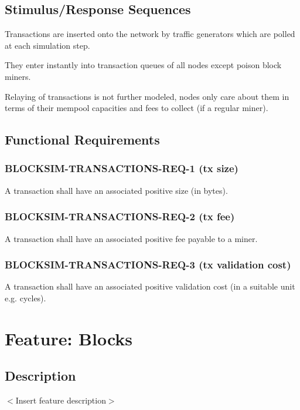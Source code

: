 \documentclass{scrreprt}
\begin{document}
\subsection{Stimulus/Response Sequences}

Transactions are inserted onto the network by traffic generators which are
polled at each simulation step.

They enter instantly into transaction queues of all nodes except poison block
miners.

Relaying of transactions is not further modeled, nodes only care about
them in terms of their mempool capacities and fees to collect
(if a regular miner).


\subsection{Functional Requirements}

\subsubsection{BLOCKSIM-TRANSACTIONS-REQ-1 (tx size)}

A transaction shall have an associated positive size (in bytes).

\subsubsection{BLOCKSIM-TRANSACTIONS-REQ-2 (tx fee)}

A transaction shall have an associated positive fee payable to a miner.

\subsubsection{BLOCKSIM-TRANSACTIONS-REQ-3 (tx validation cost)}

A transaction shall have an associated positive validation cost (in a suitable unit e.g. cycles).



\section{Feature: Blocks}

\subsection{Description}

$<$Insert feature description$>$
\end{document}
